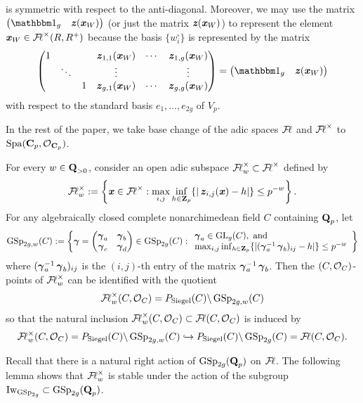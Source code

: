 is symmetric with respect to the anti-diagonal. Moreover, we may use the matrix $\begin{pmatrix}\one_g & \bfitz(\bfitx_W)\end{pmatrix}$ (or just the matrix $\bfitz(\bfitx_W)$) to represent the element $\bfitx_W\in \adicFL^\times(R, R^+)$ because the basis $\{w_i^{\square}\}$ is represented by the matrix $$\begin{pmatrix}
1 & & & \bfitz_{1,1}(\bfitx_W) & \cdots & \bfitz_{1,g}(\bfitx_W)\\
& \ddots & & \vdots & & \vdots\\
& & 1 & \bfitz_{g,1}(\bfitx_W) & \cdots & \bfitz_{g,g}(\bfitx_W)
\end{pmatrix}=\begin{pmatrix}\one_g & \bfitz(\bfitx_W)\end{pmatrix}$$ with respect to the standard basis $e_1, \ldots, e_{2g}$ of $V_p$. 

In the rest of the paper, we take base change of the adic spaces $\adicFL$ and $\adicFL^{\times}$ to $\Spa(\C_p, \calO_{\C_p})$.

For every $w\in \Q_{>0}$, consider an open adic subspace $\adicFL_w^\times\subset \adicFL^\times$ defined by $$\adicFL^\times_w:=\left\{\bfitx\in \adicFL^\times: \max_{i, j}\inf_{h\in \Z_p}\{|\bfitz_{i,j}(\bfitx)-h|\}\leq p^{-w}\right\}.$$ 
For any algebraically closed complete nonarchimedean field $C$ containing $\Q_p$, let
$$\GSp_{2g, w}(C):=\left\{\bfgamma=\begin{pmatrix}\bfgamma_a & \bfgamma_b\\ \bfgamma_c & \bfgamma_d\end{pmatrix}\in\GSp_{2g}(C):\begin{array}{l}
    \bfgamma_a\in \GL_g(C),\text{ and}\\
    \max_{i, j}\inf_{h\in \Z_p}\{|(\bfgamma_a^{-1}\bfgamma_b)_{ij}-h|\}\leq p^{-w}
\end{array} \right\}$$
where $(\bfgamma_a^{-1}\bfgamma_b)_{ij}$ is the $(i,j)$-th entry of the matrix $\bfgamma_a^{-1}\bfgamma_b$. Then the $(C, \calO_C)$-points of $\adicFL^\times_w$ can be identified with the quotient $$\adicFL^\times_w(C, \calO_C)=P_{\Siegel}(C)\backslash\GSp_{2g, w}(C)$$
so that the natural inclusion $\adicFL^\times_w(C, \calO_C)\subset \adicFL(C, \calO_C)$ is induced by
$$\adicFL^\times_w(C, \calO_C)=P_{\Siegel}(C)\backslash\GSp_{2g, w}(C)\hookrightarrow P_{\Siegel}(C)\backslash\GSp_{2g}(C)=\adicFL(C, \calO_C).$$

Recall that there is a natural right action of $\GSp_{2g}(\Q_p)$ on $\adicFL$. The following lemma shows that $\adicFL_w^\times$ is stable under the action of the subgroup $\Iw_{\GSp_{2g}}\subset \GSp_{2g}(\Q_p)$.


